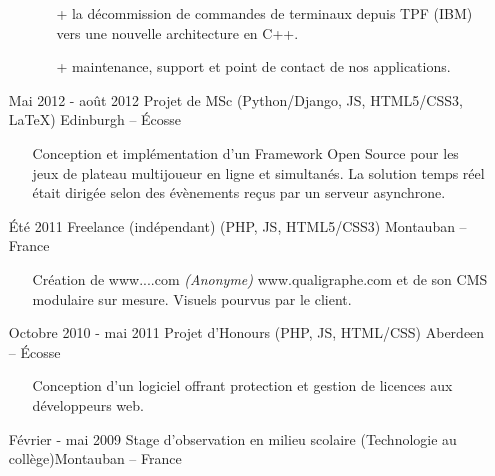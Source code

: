 \documentclass{res}
\begin{document}
\begin{resume}
\begin{itemize}
\begin{itemize}
\begin{itemize}
				\item[+] la d\'ecommission de commandes de terminaux depuis TPF (IBM) vers une nouvelle architecture en C++.
				\item[+] maintenance, support et point de contact de nos applications.
			\end{itemize}
		\end{itemize}
		\item[] Mai 2012 - ao\^ut 2012 \tabto{5cm} Projet de MSc (Python/Django, JS, HTML5/CSS3, \LaTeX{}) \hfill Edinburgh -- \'Ecosse
		\begin{itemize}
			\item[] Conception et impl\'ementation d'un Framework Open Source pour les jeux de plateau multijoueur en ligne et simultan\'es. La solution temps r\'eel \'etait dirig\'ee selon des \'ev\`enements re\c{c}us par un serveur asynchrone.
		\end{itemize}
		\item[] \'Et\'e 2011 \tabto{5cm} Freelance (ind\'ependant) (PHP, JS, HTML5/CSS3) \hfill Montauban -- France
		\begin{itemize}
			\item[] Cr\'eation de \ifisanon www....com \textit{(Anonyme)} \else www.qualigraphe.com \fi et de son CMS modulaire sur mesure. Visuels pourvus par le client. %
		\end{itemize}
		\item[] Octobre 2010 - mai 2011 \tabto{5cm} Projet d'Honours (PHP, JS, HTML/CSS) \hfill Aberdeen -- \'Ecosse
		\begin{itemize}
			\item[] Conception d'un logiciel offrant protection et gestion de licences aux d\'eveloppeurs web.
		\end{itemize}
		\item[] F\'evrier - mai 2009 \tabto{5cm} Stage d'observation en milieu scolaire (Technologie au coll\`ege)\hfill Montauban -- France

\end{itemize}
\end{resume}
\end{document}
